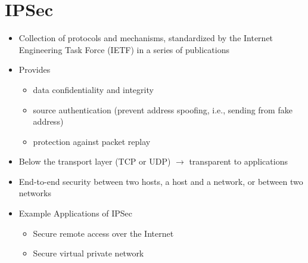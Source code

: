 \documentclass[final]{article}
\begin{document}
\section{IPSec}
\begin{itemize}[nosep]
    \item Collection of protocols and mechanisms, standardized by the Internet Engineering Task Force (IETF) in a series of publications
    \item Provides
          \begin{itemize}[nosep]
              \item data confidentiality and integrity
              \item source authentication (prevent address spoofing, i.e., sending from fake address)
              \item protection against packet replay
          \end{itemize}
    \item Below the transport layer (TCP or UDP) $\rightarrow$ transparent to applications
    \item End-to-end security between two hosts, a host and a network, or between two networks
    \item Example Applications of IPSec
          \begin{itemize}[nosep]
              \item Secure remote access over the Internet
              \item Secure virtual private network
          \end{itemize}
\end{itemize}
\end{document}
